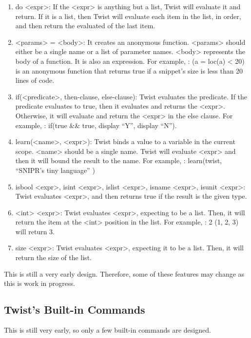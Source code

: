 \begin{enumerate}
	\item do <expr>: If the <expr> is anything but a list, Twist will evaluate it and 
	return. If it is a list, then Twist will evaluate each item in the list, in order, 
	and then return the evaluated of the last item.
	\item <params> = <body>: It creates an anonymous function. <params> should either be 
	a single name or a list of parameter names. <body> represents the body of a 
	function. It is also an expression. For example, : (a = loc(a) < 20) is an 
	anonymous function that returns true if a snippet's size is less than 20 lines of 
	code. 
	\item if(<predicate>, then-clause, else-clause): Twist evaluates the predicate. If 
	the predicate evaluates to true, then it evaluates and returns the <expr>. Otherwise, 
	it will evaluate and return the <expr> in the else clause. For example, : if(true 
	\&\& true, display ``Y'', display ``N'').
	\item learn(<name>, <expr>): Twist binds a value to a variable in the current scope. 
	<name> should be a single name. Twist will evaluate <expr> and then it will bound the 
	result to the name. For example, : learn(twist, ``SNIPR's tiny language'' )
   \item isbool <expr>, isint <expr>, islist <expr>, isname <expr>, isunit <expr>: Twist 
	evaluates <expr>, and then returns true if the result is the given type.
 	\item <int> <expr>: Twist evaluates <expr>, expecting to be a list. Then, it will 
	return the item at the <int> position in the list. For example, : 2 (1, 2, 3) will 
	return 3.
	\item size <expr>: Twist evaluates <expr>, expecting it to be a list. Then, it will 
	return the size of the list.
\end{enumerate}

This is still a very early design. Therefore, some of these features may change as this 
is work in progress.

\subsection{Twist's Built-in Commands}
\label{sec:retargetingops}

This is still very early, so only a few built-in commands are designed.

